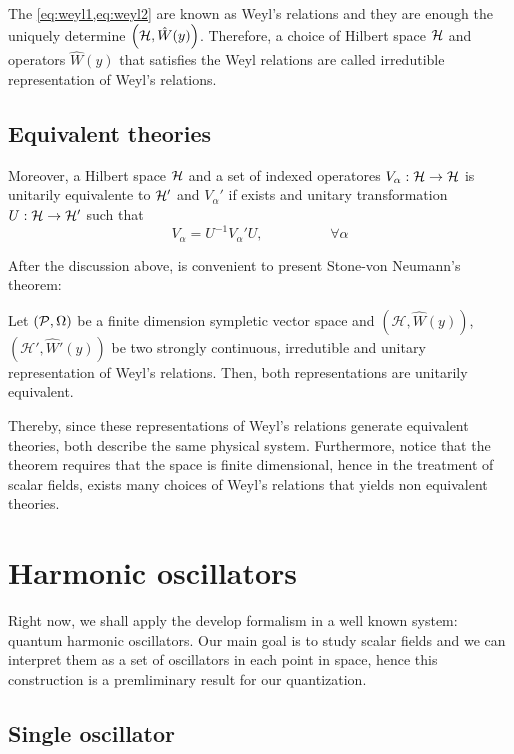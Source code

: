 The \cref{eq:weyl1,eq:weyl2} are known as Weyl's relations and they are enough the uniquely determine \(\left({\mathcal{H}},\hat{W}(y)\right)\). Therefore, a choice of Hilbert space \({\mathcal{H}}\) and operators \(\hat{W}(y)\) that satisfies the Weyl relations are called irredutible representation of Weyl's relations.

\subsection*{Equivalent theories}

Moreover, a Hilbert space \({\mathcal{H}}\) and a set of indexed operatores \(V_{\alpha}:{\mathcal{H}}\to{\mathcal{H}}\) is unitarily equivalente to \({\mathcal{H}}'\) and \(V_{\alpha}'\) if exists and unitary transformation \(U:{\mathcal{H}}\to{\mathcal{H}}'\) such that
\begin{equation}
    V_{\alpha}=U^{-1}V_{\alpha}'U,\hspace{2cm}\forall\alpha
\end{equation}

After the discussion above, is convenient to present Stone-von Neumann's theorem:
\begin{theorem}
    Let \(({\mathcal{P}},\Omega)\) be a finite dimension sympletic vector space and \(\left(\mathcal{H},\hat{W}(y)\right)\), \(\left(\mathcal{H}',\hat{W}'(y)\right)\) be two strongly continuous, irredutible and unitary representation of Weyl's relations. Then, both representations are unitarily equivalent.
\end{theorem}

Thereby, since these representations of Weyl's relations generate equivalent theories, both describe the same physical system. Furthermore, notice that the theorem requires that the space is finite dimensional, hence in the treatment of scalar fields, exists many choices of Weyl's relations that yields non equivalent theories.

\section{Harmonic oscillators}

Right now, we shall apply the develop formalism in a well known system: quantum harmonic oscillators. Our main goal is to study scalar fields and we can interpret them as a set of oscillators in each point in space, hence this construction is a premliminary result for our quantization.

\subsection*{Single oscillator}

